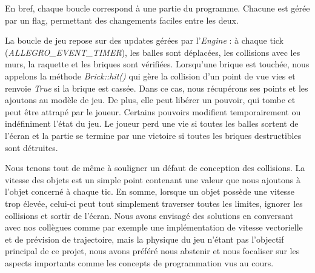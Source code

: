 \documentclass[utf8]{article}
\begin{document}
En bref, chaque boucle correspond à une partie du programme. Chacune est gérée par un flag, permettant des changements faciles entre les deux.

La boucle de jeu repose sur des updates gérées par l'\emph{Engine} : à chaque tick (\emph{ALLEGRO\_EVENT\_TIMER}), les balles sont déplacées, les collisions avec les murs, la raquette et les briques sont vérifiées. Lorsqu'une brique est touchée, nous appelons la méthode \emph{Brick::hit()} qui gère la collision d'un point de vue vies et renvoie \emph{True} si la brique est cassée. Dans ce cas, nous récupérons ses points et les ajoutons au modèle de jeu. De plus, elle peut libérer un pouvoir, qui tombe et peut être attrapé par le joueur. Certains pouvoirs modifient temporairement ou indéfiniment l'état du jeu. Le joueur perd une vie si toutes les balles sortent de l'écran et la partie se termine par une victoire si toutes les briques destructibles sont détruites.

Nous tenons tout de même à souligner un défaut de conception des collisions. La vitesse des objets est un simple point contenant une valeur que nous ajoutons à l'objet concerné à chaque tic. En somme, lorsque un objet possède une vitesse trop élevée, celui-ci peut tout simplement traverser toutes les limites, ignorer les collisions et sortir de l'écran. Nous avons envisagé des solutions en conversant avec nos collègues comme par exemple une implémentation de vitesse vectorielle et de prévision de trajectoire, mais la physique du jeu n'étant pas l'objectif principal de ce projet, nous avons préféré nous abstenir et nous focaliser sur les aspects importants comme les concepts de programmation vus au cours.
\end{document}
